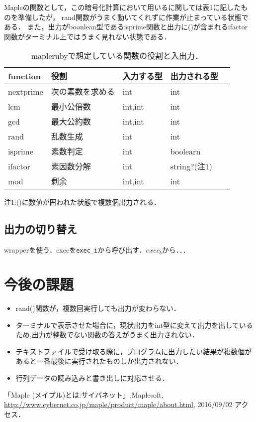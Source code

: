 \documentclass[10pt,a4j,twocolumn]{jsarticle}
\begin{document}
Mapleの関数として，この暗号化計算において用いるに関しては表1に記したものを準備したが，
rand関数がうまく動いてくれずに作業が止まっている状態である．
また，出力がboonlean型であるisprime関数と出力に()が含まれるifactor関数がターミナル上ではうまく見れない状態である．

\begin{table}[htbp]\begin{center}
\caption{maplerubyで想定している関数の役割と入出力．}
\begin{tabular}{lllll}
\hline
function  &役割  &入力する型  &出力される型  \\ \hline
nextprime  &次の素数を求める  &int  &int  \\
lcm  &最小公倍数  &int,int  &int  \\
gcd  &最大公約数  &int,int  &int  \\
rand  &乱数生成  &int  &int  \\
isprime  &素数判定  &int  &boolearn  \\
ifactor  &素因数分解  &int  &string?(注1)  \\
mod  &剰余  &int,int  &int  \\
\hline
\end{tabular}
注1:()に数値が囲われた状態で複数個出力される．
\label{default}
\end{center}
\end{table}

\subsection{出力の切り替え}
wrapperを使う．execを\verb|exec_i|から呼び出す．$exec_b$から．．．

\section{今後の課題}
\begin{itemize}
\item rand()関数が，複数回実行しても出力が変わらない．
\item ターミナルで表示させた場合に，現状出力をint型に変えて出力を出しているため,出力が整数でない関数の答えがうまく出力されない．
\item テキストファイルで受け取る際に，プログラムに出力したい結果が複数個があると一番最後に実行されたものしか出力されない．
\item 行列データの読み込みと書き出しに対応させる．
\end{itemize}
\begin{thebibliography}{9}
「Maple (メイプル)とは:サイバネット」,Maplesoft, \url{http://www.cybernet.co.jp/maple/product/maple/about.html}, 2016/09/02 アクセス．
\end{thebibliography}
\end{document}
